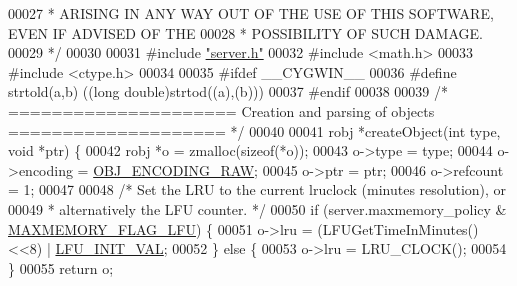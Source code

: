 \begin{DoxyCode}
00027 \textcolor{comment}{ * ARISING IN ANY WAY OUT OF THE USE OF THIS SOFTWARE, EVEN IF ADVISED OF THE}
00028 \textcolor{comment}{ * POSSIBILITY OF SUCH DAMAGE.}
00029 \textcolor{comment}{ */}
00030 
00031 \textcolor{preprocessor}{#}\textcolor{preprocessor}{include} \hyperlink{server_8h}{"server.h"}
00032 \textcolor{preprocessor}{#}\textcolor{preprocessor}{include} \textcolor{preprocessor}{<}\textcolor{preprocessor}{math}\textcolor{preprocessor}{.}\textcolor{preprocessor}{h}\textcolor{preprocessor}{>}
00033 \textcolor{preprocessor}{#}\textcolor{preprocessor}{include} \textcolor{preprocessor}{<}\textcolor{preprocessor}{ctype}\textcolor{preprocessor}{.}\textcolor{preprocessor}{h}\textcolor{preprocessor}{>}
00034 
00035 \textcolor{preprocessor}{#}\textcolor{preprocessor}{ifdef} \textcolor{preprocessor}{\_\_CYGWIN\_\_}
00036 \textcolor{preprocessor}{#}\textcolor{preprocessor}{define} \textcolor{preprocessor}{strtold}\textcolor{preprocessor}{(}\textcolor{preprocessor}{a}\textcolor{preprocessor}{,}\textcolor{preprocessor}{b}\textcolor{preprocessor}{)} \textcolor{preprocessor}{(}\textcolor{preprocessor}{(}\textcolor{preprocessor}{long} \textcolor{preprocessor}{double}\textcolor{preprocessor}{)}\textcolor{preprocessor}{strtod}\textcolor{preprocessor}{(}\textcolor{preprocessor}{(}\textcolor{preprocessor}{a}\textcolor{preprocessor}{)}\textcolor{preprocessor}{,}\textcolor{preprocessor}{(}\textcolor{preprocessor}{b}\textcolor{preprocessor}{)}\textcolor{preprocessor}{)}\textcolor{preprocessor}{)}
00037 \textcolor{preprocessor}{#}\textcolor{preprocessor}{endif}
00038 
00039 \textcolor{comment}{/* ===================== Creation and parsing of objects ==================== */}
00040 
00041 robj *createObject(\textcolor{keywordtype}{int} type, \textcolor{keywordtype}{void} *ptr) \{
00042     robj *o = zmalloc(\textcolor{keyword}{sizeof}(*o));
00043     o->type = type;
00044     o->encoding = \hyperlink{server_8h_a148bc85e3074e324a6dc5eebcad1bcd5}{OBJ\_ENCODING\_RAW};
00045     o->ptr = ptr;
00046     o->refcount = 1;
00047 
00048     \textcolor{comment}{/* Set the LRU to the current lruclock (minutes resolution), or}
00049 \textcolor{comment}{     * alternatively the LFU counter. */}
00050     \textcolor{keywordflow}{if} (server.maxmemory\_policy & \hyperlink{server_8h_aac2d3ad7a604f87e06e25233dbd01c9b}{MAXMEMORY\_FLAG\_LFU}) \{
00051         o->lru = (LFUGetTimeInMinutes()<<8) | \hyperlink{server_8h_a8cec44bf7da67aac58839ab5033bdc0a}{LFU\_INIT\_VAL};
00052     \} \textcolor{keywordflow}{else} \{
00053         o->lru = LRU\_CLOCK();
00054     \}
00055     \textcolor{keywordflow}{return} o;

\end{DoxyCode}
